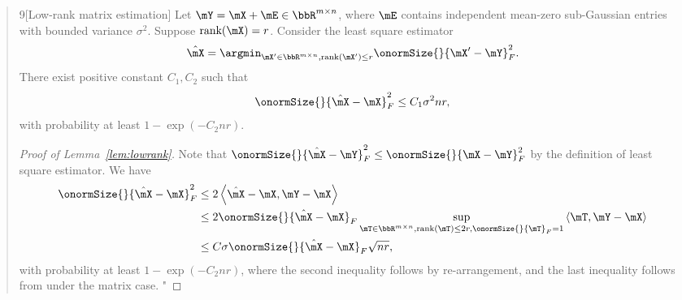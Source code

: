 \documentclass[11pt]{article}
\theoremstyle{definition}
\theoremstyle{definition}
\newcommand{\ang}[1]{\left\langle#1\right\rangle}
\begin{document}
\begin{enumerate}
\begin{enumerate}[wide]
\begin{quote}
\begin{customlemma}{9}[Low-rank matrix estimation]  Let $\mY = \mX + \mE \in \bbR^{m \times n}$, where $\mE$ contains independent mean-zero sub-Gaussian entries with bounded variance $\sigma^2$. Suppose $\text{rank}(\mX) = r$. Consider the least square estimator 
        \begin{equation}
            \hat \mX = \argmin_{\mX' \in \bbR^{m \times n}, \text{rank}(\mX') \leq r} \onormSize{}{\mX' - \mY}_F^2.
        \end{equation}
        There exist positive constant $C_1, C_2$ such that
        \begin{equation}
            \onormSize{}{\hat \mX - \mX}_F^2 \leq C_1 \sigma^2 nr,
        \end{equation}
        with probability at least $1 - \exp(-C_2 nr)$.
\end{customlemma}


\begin{proof}[Proof of Lemma~\ref{lem:lowrank}] Note that $\onormSize{}{\hat \mX - \mY}_F^2 \leq \onormSize{}{\mX - \mY}_F^2$ by the definition of least square estimator. We have 
        \begin{align}
            \onormSize{}{\hat \mX - \mX}_F^2 & \leq 2 \ang{ \hat \mX - \mX, \mY - \mX} \\ & \leq 2 \onormSize{}{\hat \mX - \mX}_F \sup_{\mT \in \bbR^{m \times n}, \text{rank}(\mT) \leq 2r, \onormSize{}{\mT}_F = 1} \ang{\mT, \mY - \mX} \\
            & \leq C \sigma  \onormSize{}{\hat \mX - \mX}_F \sqrt{nr},
        \end{align}
        with probability at least $1 - \exp(-C_2 nr)$, where the second inequality follows by re-arrangement, and the last inequality follows from \citet[Lemma E5]{han2022optimal} under the matrix case. "
\end{proof}
        \end{quote}
    
        
        

\end{enumerate}
\end{enumerate}
\end{document}
